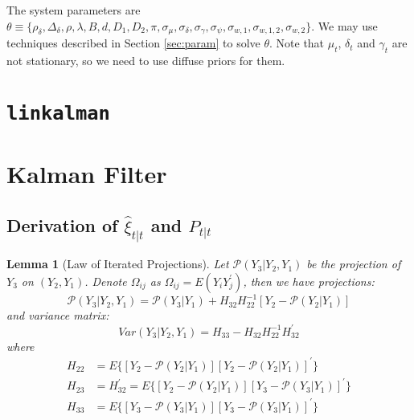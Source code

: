 \documentclass[10pt]{article}
\newtheorem{lemma}{Lemma}
\numberwithin{equation}{section}
\begin{document}
The system parameters are $\theta\equiv\{\rho_{\delta}, \Delta_{\delta}, \rho, \lambda, B, d, D_1, D_2, \pi, \sigma_{\mu}, \sigma_{\delta}, \sigma_{\gamma}, \sigma_{\psi}, \sigma_{w,1}, \sigma_{w,1,2}, \sigma_{w,2}\}$. We may use techniques described in Section \ref{sec:param} to solve $\theta$. Note that $\mu_t$, $\delta_t$ and $\gamma_{t}$ are not stationary, so we need to use diffuse priors for them. 

\section{\texttt{linkalman}} \label{sec:codebase}














\pagebreak
\printbibliography
\pagebreak
\appendix

\section{Kalman Filter}
\subsection{Derivation of $\hat{\xi}_{t|t}$ and $P_{t|t}$} \label{ap:iter_proj}
\begin{lemma}[Law of Iterated Projections] \label{lem:1}
    Let $\mathcal{P}(Y_3|Y_2,Y_1)$ be the projection of $Y_3$ on $(Y_2, Y_1)$. Denote $\Omega_{ij}$ as $\Omega_{ij} = E(Y_iY_j^{'})$, then we have projections:
    \[
        \mathcal{P}(Y_3|Y_2,Y_1) = \mathcal{P}(Y_3|Y_1)+H_{32}H_{22}^{-1}[Y_2 - \mathcal{P}(Y_2|Y_1)]
    \]
    and variance matrix:
    \[
        Var(Y_3|Y_2,Y_1) = H_{33} - H_{32}H_{22}^{-1}H_{32}^{'}
    \]
    where 
    \begin{align*}
        H_{22} &= E\{[Y_2-\mathcal{P}(Y_2|Y_1)][Y_2-\mathcal{P}(Y_2|Y_1)]^{'}\} \\
        H_{23} &= H_{32}^{'} = E\{[Y_2-\mathcal{P}(Y_2|Y_1)][Y_3-\mathcal{P}(Y_3|Y_1)]^{'}\} \\
        H_{33} &= E\{[Y_3-\mathcal{P}(Y_3|Y_1)][Y_3-\mathcal{P}(Y_3|Y_1)]^{'}\}
    \end{align*}
\end{lemma}
\end{document}
